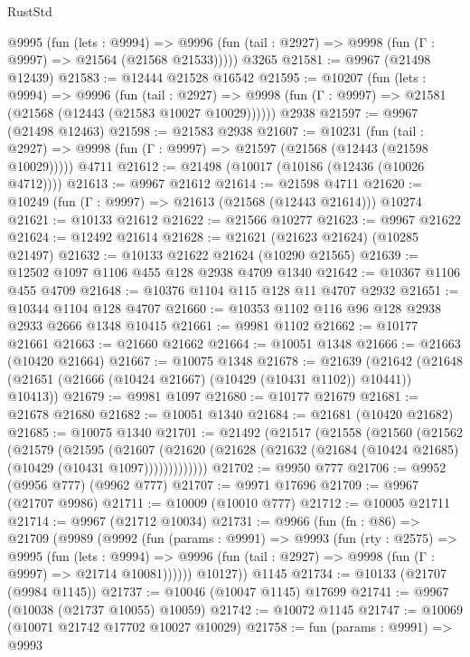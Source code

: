 \begin{lexlean}{RustStd}
\begin{coremodule}
{\begin{coremodule}
{{{{{{{{{{{{{{{{{{{{{{{{{{{{{{{{{{{{{{{{{{{{{{{{{{{{{{{{{{{{{{{{{{{{{{{{{{{{{{    @9995
      (fun (lets : @9994) =>
      @9996 (fun (tail : @2927) => @9998 (fun (Γ : @9997) => @21564 (@21568 @21533)))))
    @3265
@21581 := @9967 (@21498 @12439)
@21583 := @12444 @21528 @16542
@21595 := @10207
    (fun (lets : @9994) =>
    @9996
      (fun (tail : @2927) =>
      @9998 (fun (Γ : @9997) => @21581 (@21568 (@12443 (@21583 @10027 @10029))))))
    @2938
@21597 := @9967 (@21498 @12463)
@21598 := @21583 @2938
@21607 := @10231
    (fun (tail : @2927) => @9998 (fun (Γ : @9997) => @21597 (@21568 (@12443 (@21598 @10029)))))
    @4711
@21612 := @21498 (@10017 (@10186 (@12436 (@10026 @4712))))
@21613 := @9967 @21612
@21614 := @21598 @4711
@21620 := @10249 (fun (Γ : @9997) => @21613 (@21568 (@12443 @21614))) @10274
@21621 := @10133 @21612
@21622 := @21566 @10277
@21623 := @9967 @21622
@21624 := @12492 @21614
@21628 := @21621 (@21623 @21624) (@10285 @21497)
@21632 := @10133 @21622 @21624 (@10290 @21565)
@21639 := @12502 @1097 @1106 @455 @128 @2938 @4709 @1340
@21642 := @10367 @1106 @455 @4709
@21648 := @10376 @1104 @115 @128 @11 @4707 @2932
@21651 := @10344 @1104 @128 @4707
@21660 := @10353 @1102 @116 @96 @128 @2938 @2933 @2666 @1348 @10415
@21661 := @9981 @1102
@21662 := @10177 @21661
@21663 := @21660 @21662
@21664 := @10051 @1348
@21666 := @21663 (@10420 @21664)
@21667 := @10075 @1348
@21678 := @21639
    (@21642 (@21648 (@21651 (@21666 (@10424 @21667) (@10429 (@10431 @1102)) @10441)) @10413))
@21679 := @9981 @1097
@21680 := @10177 @21679
@21681 := @21678 @21680
@21682 := @10051 @1340
@21684 := @21681 (@10420 @21682)
@21685 := @10075 @1340
@21701 := @21492
    (@21517
      (@21558
        (@21560
          (@21562
            (@21579
              (@21595
                (@21607
                  (@21620 (@21628 (@21632 (@21684 (@10424 @21685) (@10429 (@10431 @1097)))))))))))))
@21702 := @9950 @777
@21706 := @9952 (@9956 @777) (@9962 @777)
@21707 := @9971 @17696
@21709 := @9967 (@21707 @9986)
@21711 := @10009 (@10010 @777)
@21712 := @10005 @21711
@21714 := @9967 (@21712 @10034)
@21731 := @9966
    (fun (fn : @86) =>
    @21709
      (@9989
        (@9992
          (fun (params : @9991) =>
          @9993
            (fun (rty : @2575) =>
            @9995
              (fun (lets : @9994) =>
              @9996 (fun (tail : @2927) => @9998 (fun (Γ : @9997) => @21714 @10081))))))
        @10127))
    @1145
@21734 := @10133 (@21707 (@9984 @1145))
@21737 := @10046 (@10047 @1145) @17699
@21741 := @9967 (@10038 (@21737 @10055) @10059)
@21742 := @10072 @1145
@21747 := @10069 (@10071 @21742 @17702 @10027 @10029)
@21758 := fun (params : @9991) =>
  @9993
}}}}}}}}}}}}}}}}}}}}}}}}}}}}}}}}}}}}}}}}}}}}}}}}}}}}}}}}}}}}}}}}}}}}}}}}}}}}}}
\end{coremodule}}
\end{coremodule}
\end{lexlean}
